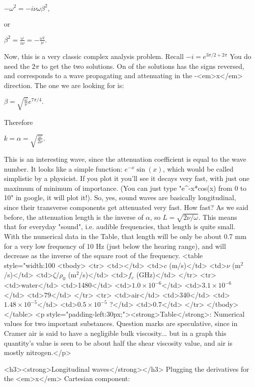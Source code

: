 $ -\omega^2 = - i \nu \omega \beta^2,$

or

$ \beta^2 = \frac{\omega}{i \nu} = - \frac{\omega i}{\nu} .$

Now, this is a very classic complex analysis problem. Recall $  -i=e^{3\pi/2+2\pi} $ You do need the $ 2\pi$ to get the two solutions. On of the solutions has the signs reversed, and corresponds to a wave propagating and attenuating in the -<em>x</em> direction. The one we are looking for is:

$ \beta =\sqrt{ \frac{\omega}{ \nu}}e^{ 7 \pi/4}.$

Therefore

$ k=\alpha =\sqrt{ \frac{\omega}{ 2 \nu}}.$

This is an interesting wave, since the attenuation coefficient is equal to the wave number. It looks like a simple function: $ e^{-x}\sin(x)$, which would be called simplistic by a physicist. If you plot it you'll see it decays very fast, with just one maximum of minimum of importance. (You can just type "e^-x*cos(x) from 0 to 10" in google, it will plot it!). So, yes, sound waves are basically longitudinal, since their transverse components get attenuated very fast. How fast? As we said before, the attenuation length is the inverse of $ \alpha$, so $ L=\sqrt{2\nu/\omega}$. This means that for everyday "sound", i.e. audible frequencies, that length is quite small. With the numerical data in the Table, that length will be only be about 0.7 mm for a very low frequency of 10 Hz (just below the hearing range), and will decrease as the inverse of the square root of the frequency.
<table style="width:100%
<tbody>
<tr>
<td></td>
<td>$ c$ (m/s)</td>
<td>$ \nu$ (m$ {}^2$/s)</td>
<td>$ \zeta/\rho_0$ (m$ {}^2$/s)</td>
<td>$ f_c$ (GHz)</td>
</tr>
<tr>
<td>water</td>
<td>1480</td>
<td>$ 1.0 \times 10^{-6}$</td>
<td>$ 3.1 \times 10^{-6}$</td>
<td>$ 79$</td>
</tr>
<tr>
<td>air</td>
<td>340</td>
<td>$ 1.48 \times 10^{-5}$</td>
<td>$ 0.5 \times 10^{-5}$ ?</td>
<td>$ 0.7$</td>
</tr>
</tbody>
</table>
<p style="padding-left:30px;"><strong>Table</strong>: Numerical values for two important substances. Question marks are speculative, since in Cramer air is said to have a negligible bulk viscosity... but in a graph this quantity's value is seen to be about half the shear viscosity value, and air is mostly nitrogen.</p>

<h3><strong>Longitudinal waves</strong></h3>
Plugging the derivatives for the <em>x</em> Cartesian component:

